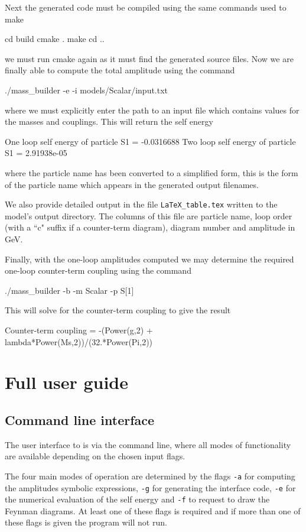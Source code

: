 Next the generated \CC code must be compiled using the same commands used to make \mb
\begin{lstterm}
cd build
cmake .
make
cd ..
\end{lstterm}
we must run cmake again as it must find the generated source files.
Now we are finally able to compute the total amplitude using the command
\begin{lstterm}
./mass_builder -e -i models/Scalar/input.txt
\end{lstterm}
where we must explicitly enter the path to an input file which contains values for the masses and couplings.  This will return the self energy
\begin{lstterm}
One loop self energy of particle S1 = -0.0316688
Two loop self energy of particle S1 = 2.91938e-05
\end{lstterm}
where the particle name has been converted to a simplified form, this is the form of the particle name which appears in the generated output filenames.

 We also provide detailed output in the file \lstinline{LaTeX_table.tex} written to the model's output directory.  The columns of this file are particle name, loop order (with a ``c" suffix if a counter-term diagram), diagram number and amplitude in GeV.
 
Finally, with the one-loop amplitudes computed we may determine the required one-loop counter-term coupling using the command

\begin{lstterm}
./mass_builder -b -m Scalar -p S[1]
\end{lstterm}
This will solve for the counter-term coupling to give the result
\begin{lstterm}
Counter-term coupling = -(Power(g,2) + lambda*Power(Ms,2))/(32.*Power(Pi,2))
\end{lstterm}


\section{Full user guide}\label{sec:user_guide}
\subsection{Command line interface}

The user interface to \mb is via the command line, where all modes of functionality are available depending on the chosen input flags.

The four main modes of operation are determined by the flags \lstinline{-a} for computing the amplitudes symbolic expressions, \lstinline{-g} for generating the \tsil interface code, \lstinline{-e} for the numerical evaluation of the self energy and \lstinline{-f} to request \feynarts to draw the Feynman diagrams.  At least one of these flags is required and if more than one of these flags is given the program will not run.

